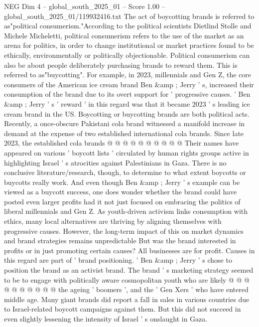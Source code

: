 \begin{textsample}{NEG Dim 4 – global\_south\_2025\_01 – Score 1.00 – global\_south\_2025\_01/119932416.txt}  \label{ex:f4_neg_448}
The act of boycotting brands is referred to as"political consumerism."According to the political scientists Dietlind Stolle and Michele Micheletti, political consumerism refers to the use of the market as an arena for politics, in order to change institutional or market practices found to be ethically, environmentally or politically objectionable.
Political consumerism can also be about people deliberately purchasing brands to reward them.
This is referred to as"buycotting".
For example, in 2023, millennials and Gen Z, the core consumers of the American ice cream brand Ben \&amp ; Jerry ' s, increased their consumption of the brand due to its overt support for ' progressive causes. ' Ben \&amp ; Jerry ' s ' reward ' in this regard was that it became 2023 ' s leading ice cream brand in the US.
Boycotting or buycotting brands are both political acts.
Recently, a once-obscure Pakistani cola brand witnessed a manifold increase in demand at the expense of two established international cola brands.
Since late 2023, the established cola brands @ @ @ @ @ @ @ @ @ @ Their names have appeared on various ' boycott lists ' circulated by human rights groups active in highlighting Israel ' s atrocities against Palestinians in Gaza.
There is no conclusive literature/research, though, to determine to what extent boycotts or buycotts really work.
And even though Ben \&amp ; Jerry ' s example can be viewed as a buycott success, one does wonder whether the brand could have posted even larger profits had it not just focused on embracing the politics of liberal millennials and Gen Z.
As youth-driven activism links consumption with ethics, many local alternatives are thriving by aligning themselves with progressive causes.
However, the long-term impact of this on market dynamics and brand strategies remains unpredictable But was the brand interested in profits or in just promoting certain causes?
All businesses are for profit.
Causes in this regard are part of ' brand positioning. ' Ben \&amp ; Jerry ' s chose to position the brand as an activist brand.
The brand ' s marketing strategy seemed to be to engage with politically aware cosmopolitan youth who are likely @ @ @ @ @ @ @ @ @ @ the ageing ' boomers ', and the ' Gen Xers ' who have entered middle age.
Many giant brands did report a fall in sales in various countries due to Israel-related boycott campaigns against them.
But this did not succeed in even slightly lessening the intensity of Israel ' s onslaught in Gaza.

\end{textsample}
